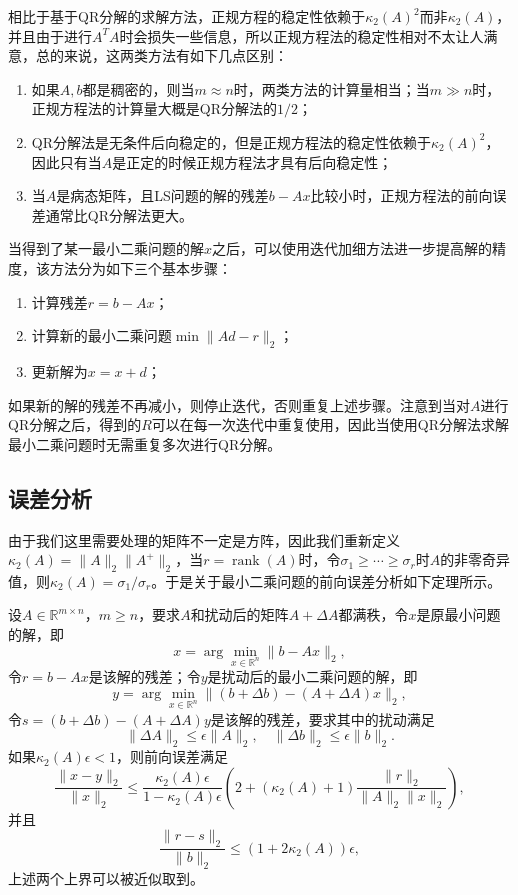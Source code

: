 \documentclass[a4paper,10pt]{ctexart}
\begin{document}
相比于基于QR分解的求解方法，正规方程的稳定性依赖于$ \kappa_2(A)^2 $而非$ \kappa_2(A) $，并且由于进行$ A^TA $时会损失一些信息，所以正规方程法的稳定性相对不太让人满意，总的来说，这两类方法有如下几点区别：
\begin{enumerate}
    \item 如果$ A,b $都是稠密的，则当$ m\approx n $时，两类方法的计算量相当；当$ m\gg n $时，正规方程法的计算量大概是QR分解法的$ 1 / 2 $；
    \item QR分解法是无条件后向稳定的，但是正规方程法的稳定性依赖于$ \kappa_2(A)^2 $，因此只有当$ A $是正定的时候正规方程法才具有后向稳定性；
    \item 当$ A $是病态矩阵，且LS问题的解的残差$ b-Ax $比较小时，正规方程法的前向误差通常比QR分解法更大。
\end{enumerate}

当得到了某一最小二乘问题的解$ x $之后，可以使用迭代加细方法进一步提高解的精度，该方法分为如下三个基本步骤：
\begin{enumerate}
    \item 计算残差$ r = b-Ax $；
    \item 计算新的最小二乘问题$ \min \| Ad-r \|_2 $；
    \item 更新解为$ x = x + d $；
\end{enumerate}
如果新的解的残差不再减小，则停止迭代，否则重复上述步骤。注意到当对$ A $进行QR分解之后，得到的$ R $可以在每一次迭代中重复使用，因此当使用QR分解法求解最小二乘问题时无需重复多次进行QR分解。

\subsection{误差分析}
由于我们这里需要处理的矩阵不一定是方阵，因此我们重新定义$ \kappa_2(A) = \| A \|_2 \| A^+ \|_2 $，当$ r=\operatorname{rank}(A) $时，令$ \sigma_1\geqslant \cdots \geqslant \sigma_r $时$ A $的非零奇异值，则$ \kappa_2(A) = \sigma_1 / \sigma_r $。于是关于最小二乘问题的前向误差分析如下定理所示。
\begin{theorem}
    设$ A\in \mathbb{R}^{m\times n} $，$ m\geqslant n $，要求$ A $和扰动后的矩阵$ A+\Delta A $都满秩，令$ x $是原最小问题的解，即
    \[
        x=\arg\min_{x\in \mathbb{R}^n} \| b-Ax \|_2,
    \]
    令$ r = b -Ax $是该解的残差；令$ y $是扰动后的最小二乘问题的解，即
    \[
        y = \arg\min_{x\in \mathbb{R}^n} \| (b+\Delta b) - (A+\Delta A)x \|_2,
    \]
    令$ s = (b+\Delta b) - (A+\Delta A)y $是该解的残差，要求其中的扰动满足
    \[
        \| \Delta A \|_2 \leqslant  \epsilon \| A \|_2,\quad \| \Delta b \|_2 \leqslant \epsilon \| b \|_2.
    \]
    如果$ \kappa_2(A)\epsilon<1 $，则前向误差满足
    \begin{equation}
        \frac{\| x-y \|_2}{\| x \|_2} \leqslant \frac{\kappa_2(A)\epsilon}{1-\kappa_2(A)\epsilon} \left( 2 + (\kappa_2(A)+1) \frac{\| r \|_2}{\| A \|_2 \| x \|_2} \right) ,
    \end{equation}
    并且
    \begin{equation}
        \frac{\| r-s \|_2}{\| b \|_2} \leqslant  (1+2\kappa_2(A))\epsilon,
    \end{equation}
    上述两个上界可以被近似取到。
\end{theorem}
\end{document}
